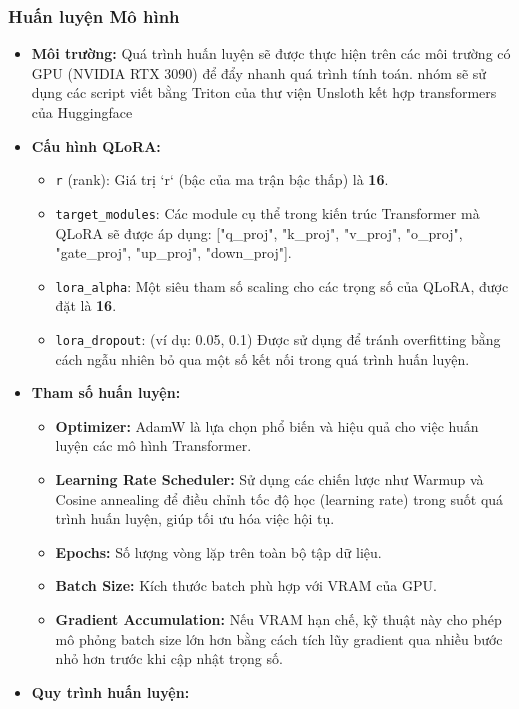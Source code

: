 \subsubsection{Huấn luyện Mô hình}
\begin{itemize}
    \item \textbf{Môi trường:} Quá trình huấn luyện sẽ được thực hiện trên các môi trường có GPU (NVIDIA RTX 3090) để đẩy nhanh quá trình tính toán. nhóm sẽ sử dụng các script viết bằng Triton của thư viện Unsloth kết hợp transformers của Huggingface
    \item \textbf{Cấu hình QLoRA:}
    \begin{itemize}
        \item \texttt{r} (rank): Giá trị `r` (bậc của ma trận bậc thấp) là \textbf{16}.
        \item \texttt{target\_modules}: Các module cụ thể trong kiến trúc Transformer mà QLoRA sẽ được áp dụng: ["q\_proj", "k\_proj", "v\_proj", "o\_proj", "gate\_proj", "up\_proj", "down\_proj"].
        \item \texttt{lora\_alpha}: Một siêu tham số scaling cho các trọng số của QLoRA, được đặt là \textbf{16}.
        \item \texttt{lora\_dropout}: (ví dụ: 0.05, 0.1) Được sử dụng để tránh overfitting bằng cách ngẫu nhiên bỏ qua một số kết nối trong quá trình huấn luyện.
    \end{itemize}
    \item \textbf{Tham số huấn luyện:}
    \begin{itemize}
        \item \textbf{Optimizer:} AdamW là lựa chọn phổ biến và hiệu quả cho việc huấn luyện các mô hình Transformer.
        \item \textbf{Learning Rate Scheduler:} Sử dụng các chiến lược như Warmup và Cosine annealing để điều chỉnh tốc độ học (learning rate) trong suốt quá trình huấn luyện, giúp tối ưu hóa việc hội tụ.
        \item \textbf{Epochs:} Số lượng vòng lặp trên toàn bộ tập dữ liệu.
        \item \textbf{Batch Size:} Kích thước batch phù hợp với VRAM của GPU.
        \item \textbf{Gradient Accumulation:} Nếu VRAM hạn chế, kỹ thuật này cho phép mô phỏng batch size lớn hơn bằng cách tích lũy gradient qua nhiều bước nhỏ hơn trước khi cập nhật trọng số.
    \end{itemize}
    \item \textbf{Quy trình huấn luyện:}

\end{itemize}
